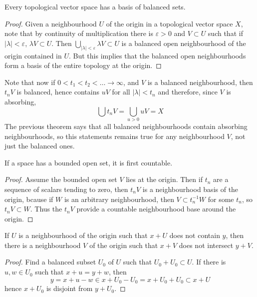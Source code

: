 \begin{theorem}
    Every topological vector space has a basis of balanced sets.
\end{theorem}
\begin{proof}
    Given a neighbourhood $U$ of the origin in a topological vector space $X$, note that by continuity of multiplication there is $\varepsilon > 0$ and $V \subset U$ such that if $|\lambda| < \varepsilon$, $\lambda V \subset U$. Then $\bigcup_{|\lambda| < \varepsilon} \lambda V \subset U$ is a balanced open neighbourhood of the origin contained in $U$. But this implies that the balanced open neighbourhoods form a basis of the entire topology at the origin.
\end{proof}

Note that now if $0 < t_1 < t_2 < \dots \to \infty$, and $V$ is a balanced neighbourhood, then $t_n V$ is balanced, hence contains $uV$ for all $|\lambda| < t_n$ and therefore, since $V$ is absorbing,
%
\[ \bigcup t_n V = \bigcup_{u > 0} uV = X \]
%
The previous theorem says that all balanced neighbourhoods contain absorbing neighbourhoods, so this statements remains true for any neighbourhood $V$, not just the balanced ones.

\begin{prop}
    If a space has a bounded open set, it is first countable.
\end{prop}
\begin{proof}
    Assume the bounded open set $V$ lies at the origin. Then if $t_n$ are a sequence of scalars tending to zero, then $t_n V$ is a neighbourhood basis of the origin, bcause if $W$ is an arbitrary neighbourhood, then $V \subset t_n^{-1} W$ for some $t_n$, so $t_n V \subset W$. Thus the $t_n V$ provide a countable neighbourhood base around the origin.
\end{proof}

\begin{lemma}
    If $U$ is a neighbourhood of the origin such that $x + U$ does not contain $y$, then there is a neighbourhood $V$ of the origin such that $x + V$ does not intersect $y + V$.
\end{lemma}
\begin{proof}
    Find a balanced subset $U_0$ of $U$ such that $U_0 + U_0 \subset U$. If there is $u,w \in U_0$ such that $x + u = y + w$, then
    \[ y = x + u - w \in x + U_0 - U_0 = x + U_0 + U_0 \subset x + U \]
    hence $x + U_0$ is disjoint from $y + U_0$.
\end{proof}

